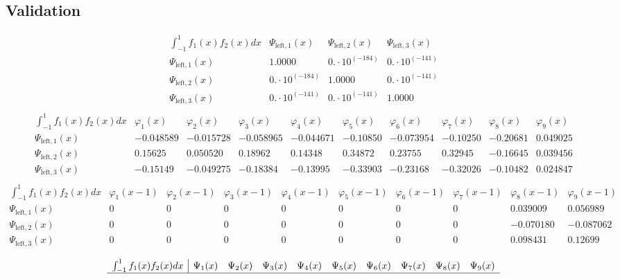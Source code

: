 \documentclass{article}
\begin{document}
 \begin{landscape}
 \subsection{Validation}$$ \begin{array}{l|lll}
\int_{-1}^1 f_1(x)f_2(x) dx& \Psi_{\text{left},1}(x)& \Psi_{\text{left},2}(x)& \Psi_{\text{left},3}(x) \\ \hline 
 \Psi_{\text{left},1}(x) & 1.0000 & 0.\cdot 10^{(-184)} & 0.\cdot 10^{(-141)} \\ 
\Psi_{\text{left},2}(x) & 0.\cdot 10^{(-184)} & 1.0000 & 0.\cdot 10^{(-141)} \\ 
\Psi_{\text{left},3}(x) & 0.\cdot 10^{(-141)} & 0.\cdot 10^{(-141)} & 1.0000 \\ 
\end{array} $$
$$ \begin{array}{l|lllllllll}
\int_{-1}^1 f_1(x)f_2(x) dx& \varphi_1(x)& \varphi_2(x)& \varphi_3(x)& \varphi_4(x)& \varphi_5(x)& \varphi_6(x)& \varphi_7(x)& \varphi_8(x)& \varphi_9(x) \\ \hline 
 \Psi_{\text{left},1}(x) & -0.048589 & -0.015728 & -0.058965 & -0.044671 & -0.10850 & -0.073954 & -0.10250 & -0.20681 & 0.049025 \\ 
\Psi_{\text{left},2}(x) & 0.15625 & 0.050520 & 0.18962 & 0.14348 & 0.34872 & 0.23755 & 0.32945 & -0.16645 & 0.039456 \\ 
\Psi_{\text{left},3}(x) & -0.15149 & -0.049275 & -0.18384 & -0.13995 & -0.33903 & -0.23168 & -0.32026 & -0.10482 & 0.024847 \\ 
\end{array} $$ 
$$ \begin{array}{l|lllllllll}
\int_{-1}^1 f_1(x)f_2(x) dx& \varphi_1(x-1)& \varphi_2(x-1)& \varphi_3(x-1)& \varphi_4(x-1)& \varphi_5(x-1)& \varphi_6(x-1)& \varphi_7(x-1)& \varphi_8(x-1)& \varphi_9(x-1) \\ \hline 
 \Psi_{\text{left},1}(x) & 0 & 0 & 0 & 0 & 0 & 0 & 0 & 0.039009 & 0.056989 \\ 
\Psi_{\text{left},2}(x) & 0 & 0 & 0 & 0 & 0 & 0 & 0 & -0.070180 & -0.087062 \\ 
\Psi_{\text{left},3}(x) & 0 & 0 & 0 & 0 & 0 & 0 & 0 & 0.098431 & 0.12699 \\ 
\end{array} $$ 
$$ \begin{array}{l|lllllllll}
\int_{-1}^1 f_1(x)f_2(x) dx& \Psi_1(x)& \Psi_2(x)& \Psi_3(x)& \Psi_4(x)& \Psi_5(x)& \Psi_6(x)& \Psi_7(x)& \Psi_8(x)& \Psi_9(x) \\ \hline 

\end{array}$$
\end{landscape}
\end{document}
